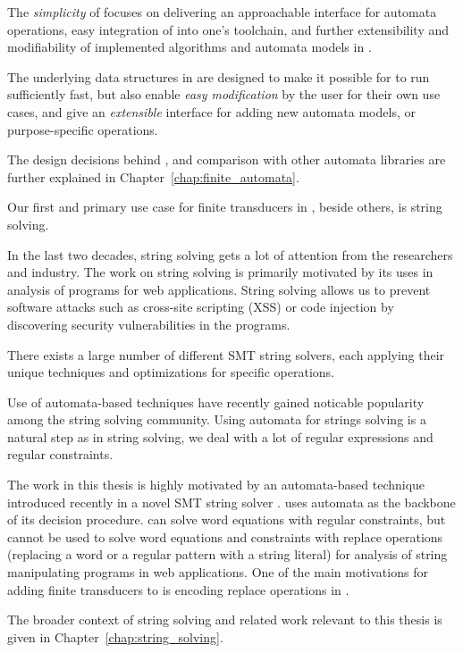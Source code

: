 The \emph{simplicity} of \mata focuses on delivering an approachable interface for automata operations, easy integration of \mata into one's toolchain, and further extensibility and modifiability of implemented algorithms and automata models in \mata.

The underlying data structures in \mata are designed to make it possible for \mata to run sufficiently fast, but also enable \emph{easy modification} by the user for their own use cases, and give an \emph{extensible} interface for adding new automata models, or purpose-specific operations.

The design decisions behind \mata, and comparison with other automata libraries are further explained in Chapter~\ref{chap:finite_automata}.

Our first and primary use case for finite transducers in \mata, beside others, is string solving.

In the last two decades, string solving gets a lot of attention from the researchers and industry.
The work on string solving is primarily motivated by its uses in analysis of programs for web applications.
String solving allows us to prevent software attacks such as cross-site scripting (XSS) or code injection by discovering security vulnerabilities in the programs.

There exists a large number of different SMT string solvers, each applying their unique techniques and optimizations for specific operations.

Use of automata-based techniques have recently gained noticable popularity among the string solving community.
Using automata for strings solving is a natural step as in string solving, we deal with a lot of regular expressions and regular constraints.

The work in this thesis is highly motivated by an automata-based technique introduced recently in a novel SMT string solver \noodler.
\noodler uses automata as the backbone of its decision procedure.
\noodler can solve word equations with regular constraints, but cannot be used to solve word equations and constraints with replace operations (replacing a word or a regular pattern with a string literal) for analysis of string manipulating programs in web applications.
One of the main motivations for adding finite transducers to \mata is encoding replace operations in \noodler.

The broader context of string solving and related work relevant to this thesis is given in Chapter~\ref{chap:string_solving}.

